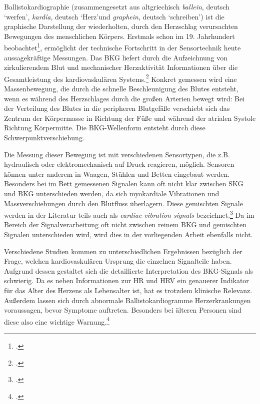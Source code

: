	Ballistokardiographie (zusammengesetzt aus altgriechisch \textit{ballein}, deutsch \textquoteleft werfen\textquoteright, \textit{kardía}, deutsch \textquoteleft Herz\textquoteright und \textit{graphein}, deutsch \textquoteleft schreiben\textquoteright) ist die graphische Darstellung der wiederholten, durch den Herzschlag verursachten Bewegungen des menschlichen Körpers. Erstmals schon im 19. Jahrhundert beobachtet\footcite[Vgl.][]{Gordon1877}, ermöglicht der technische Fortschritt in der Sensortechnik heute aussagekräftige Messungen. Das \ac{BKG} liefert durch die Aufzeichnung von zirkulierendem Blut und mechanischer Herzaktivität Informationen über die Gesamtleistung des kardiovaskulären Systems.\footcite[Vgl.][]{Pinheiro2010} Konkret gemessen wird eine Massenbewegung, die durch die schnelle Beschleunigung des Blutes entsteht, wenn es während des Herzschlages durch die großen Arterien bewegt wird: Bei der Verteilung des Blutes in die peripheren Blutgefäße verschiebt sich das Zentrum der Körpermasse in Richtung der Füße und während der atrialen Systole Richtung Körpermitte. Die \ac{BKG}-Wellenform entsteht durch diese Schwerpunktverschiebung.
	
	Die Messung dieser Bewegung ist mit verschiedenen Sensortypen, die z.B. hydraulisch oder elektromechanisch auf Druck reagieren, möglich. Sensoren können unter anderem in Waagen, Stühlen und Betten eingebaut werden. Besonders bei im Bett gemessenen Signalen kann oft nicht klar zwischen \ac{SKG} und \ac{BKG} unterschieden werden, da sich myokardiale Vibrationen und Massverschiebungen durch den Blutfluss überlagern. Diese gemischten Signale werden in der Literatur teils auch als \textit{cardiac vibration signals} bezeichnet.\footcite[Vgl.][]{Bruser2013} Da im Bereich der Signalverarbeitung oft nicht zwischen reinem \ac{BKG} und gemischten Signalen unterschieden wird, wird dies in der vorliegenden Arbeit ebenfalls nicht.
	
	Verschiedene Studien kommen zu unterschiedlichen Ergebnissen bezüglich der Frage, welchen kardiovaskulären Ursprung die einzelnen Signalteile haben. Aufgrund dessen gestaltet sich die detaillierte Interpretation des \ac{BKG}-Signals als schwierig. Da es neben Informationen zur \ac{HR} und \ac{HRV} ein genauerer Indikator für das Alter des Herzens als Lebensalter ist, hat es trotzdem klinische Relevanz. Außerdem lassen sich durch abnormale Ballistokardiogramme Herzerkrankungen voraussagen, bevor Symptome auftreten. Besonders bei älteren Personen sind diese also eine wichtige Warnung.\footcite[Vgl. zu diesem Absatz][]{Pinheiro2010}
	
